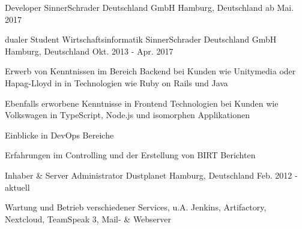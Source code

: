 

\begin{cventries}

  \cventry
    {Developer} %
    {SinnerSchrader Deutschland GmbH} %
    {Hamburg, Deutschland} %
    {ab Mai. 2017} %
    {
    }

  \cventry
    {dualer Student Wirtschaftsinformatik} %
    {SinnerSchrader Deutschland GmbH} %
    {Hamburg, Deutschland} %
    {Okt. 2013 - Apr. 2017} %
    {
      \begin{cvitems} %
        \item {Erwerb von Kenntnissen im Bereich Backend bei Kunden wie Unitymedia oder Hapag-Lloyd in in Technologien wie Ruby on Rails und Java}
        \item {Ebenfalls erworbene Kenntnisse in Frontend Technologien bei Kunden wie Volkswagen in TypeScript, Node.js und isomorphen Applikationen}
        \item {Einblicke in DevOps Bereiche}
        \item {Erfahrungen im Controlling und der Erstellung von BIRT Berichten}
      \end{cvitems}
    }

  \cventry
    {Inhaber \& Server Administrator} %
    {Dustplanet} %
    {Hamburg, Deutschland} %
    {Feb. 2012 - aktuell} %
    {
      \begin{cvitems} %
      	\item {Wartung und Betrieb verschiedener Services, u.A. Jenkins, Artifactory, Nextcloud, TeamSpeak 3, Mail- \& Webserver}
      \end{cvitems}
    }

\end{cventries}
